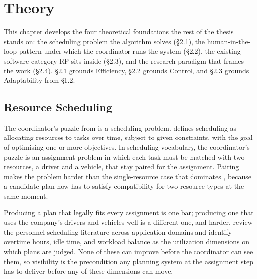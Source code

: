 \chapter{Theory}
\label{chap:theory}


This chapter develops the four theoretical foundations the rest of the thesis stands on: the scheduling problem the algorithm solves (§2.1), the human-in-the-loop pattern under which the coordinator runs the system (§2.2), the existing software category RP sits inside (§2.3), and the research paradigm that frames the work (§2.4). §2.1 grounds Efficiency, §2.2 grounds Control, and §2.3 grounds Adaptability from §1.2.


\section{Resource Scheduling}
\label{sec:scheduling}


The coordinator's puzzle from  is a scheduling problem. \textcite{pinedo2016scheduling} defines scheduling as allocating resources to tasks over time, subject to given constraints, with the goal of optimising one or more objectives. In scheduling vocabulary, the coordinator's puzzle is an assignment problem in which each task must be matched with two resources, a driver and a vehicle, that stay paired for the assignment. Pairing makes the problem harder than the single-resource case that dominates \parencite{pinedo2016scheduling}, because a candidate plan now has to satisfy compatibility for two resource types at the same moment.

Producing a plan that legally fits every assignment is one bar; producing one that uses the company's drivers and vehicles well is a different one, and harder. \textcite{ernst2004staff} review the personnel-scheduling literature across application domains and identify overtime hours, idle time, and workload balance as the utilization dimensions on which plans are judged. None of these can improve before the coordinator can see them, so visibility is the precondition any planning system at the assignment step has to deliver before any of these dimensions can move.

